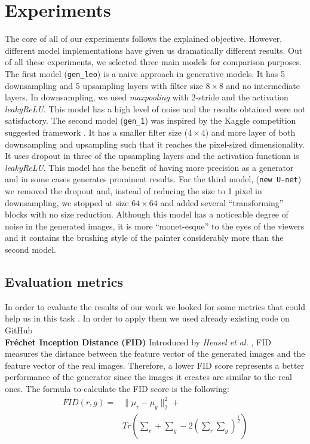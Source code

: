 \documentclass[10pt,twocolumn,letterpaper]{article}
\begin{document}
\section{Experiments}
The core of all of our experiments follows the explained objective. However, different model implementations have given us dramatically different results. Out of all these experiments, we selected three main models for comparison purposes. The first model (\texttt{gen\_leo}) is a naive approach in generative models. It has 5 downsampling and 5 upsampling layers with filter size $8 \times 8$ and no intermediate layers. In downsampling, we used \textit{maxpooling} with 2-stride and the activation \textit{leakyReLU}. This model has a high level of noise and the results obtained were not satisfactory. The second model (\texttt{gen\_1}) was inspired by the Kaggle competition suggested framework \cite{kaggle}. It has a smaller filter size ($4 \times 4$) and more layer of both downsampling and upsampling such that it reaches the pixel-sized dimensionality. It uses dropout in three of the upsampling layers and the activation functionn is \textit{leakyReLU}. This model has the benefit of having more precision as a generator and in some cases generates prominent results. For the third model, (\texttt{new U-net}) we removed the dropout and, instead of reducing the size to 1 pixel in downsampling, we stopped at size $64 \times 64$ and added several “transforming” blocks with no size reduction. Although this model has a noticeable degree of noise in the generated images, it is more “monet-esque” to the eyes of the viewers and it contains the brushing style of the painter considerably more than the second model. 

\subsection{Evaluation metrics}
In order to evaluate the results of our work we looked for some metrics that could help us in this task \cite{metrics}. In order to apply them we used already existing code on GitHub \cite{metricsRepo}\\
\textbf{Fréchet Inception Distance (FID)} Introduced by \textit{Heusel et al.} \cite{fid}, FID measures the distance between the feature vector of the generated images and the feature vector of the real images. Therefore, a lower FID score represents a better performance of the generator since the images it creates are similar to the real ones. The formula to calculate the FID score is the following:
\begin{equation}
	\begin{split}
		\textstyle FID(r, g) = & \| \mu_{r} - \mu_{g} \| _{2}^{2} + \\ 
			& Tr(\sum_{r} +  \sum_{g} - 2(\sum_{r}\sum_{g})^\frac{1}{2})
	\end{split}
\end{equation}
 
\end{document}
